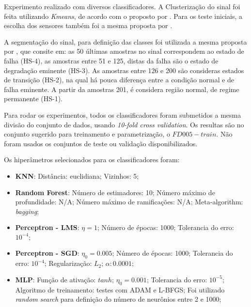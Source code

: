 \documentclass[review]{elsarticle}
\begin{document}
Experimento realizado com diversos classificadores. A Clusterização do sinal foi feita utilizando \emph{Kmeans}, de acordo com o proposto por \cite{wang2008similarity}. Para os teste iniciais, a escolha dos sensores também foi a mesma proposta por \cite{wang2008similarity}. 

A segmentação do sinal, para definição das classes foi utilizada a mesma proposta por \cite{tamilselvan2013failure}, que consite em: as 50 últimas amostras no sinal correspondem ao estado de falha (HS-4), as amostras entre 51 e 125, distas da falha são o estado de degradação eminente (HS-3). As amostras entre 126 e 200 são consideras estados de transição (HS-2), na qual há pouca diferença entre a condição normal e de falha eminente. A partir da amostras 201, é considera região normal, de regime permanente (HS-1).

Para rodar os experimentos, todos os classificadores foram submetidos a mesma divisão do conjunto de dados, usando \emph{10-fold cross validation}. Os resultas são no conjunto sugerido para treinamento e parametrização, o \emph{$FD005-train$}. Não foram usados os conjuntos de teste ou validação disponibilizados.

Os hiperâmetros selecionados para os classificadores foram:
\begin{itemize}
	\item \textbf{KNN}: Distância: euclidiana; Vizinhos: 5;
	\item \textbf{Random Forest}: Número de estimadores: 10; Número máximo de profundidade: N/A; Número máximo de ramificações: N/A; Meta-algorithm: \emph{bagging};
	\item \textbf{Perceptron - LMS}: $\eta=1$; Número de épocas: 1000; Tolerancia do erro: $10^{-4}$;
	\item \textbf{Perceptron - SGD}: $\eta_0=0.005$; Número de épocas: 1000; Tolerancia do erro: $10^{-4}$; Regularização: $L_2$; $\alpha:0.0001$;
	\item \textbf{MLP}: Função de ativação: $tanh$; $\eta_0=0.001$; Tolerancia do erro: $10^{-5}$; Algoritmo de treinamento: testes com ADAM e L-BFGS; Foi utilizado \emph{random search} para definição do número de neurônios entre 2 e 1000;
\end{itemize}
\end{document}
